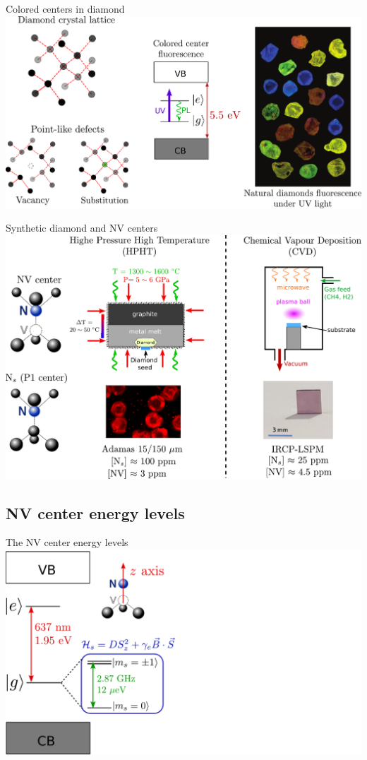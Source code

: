 \documentclass{beamer}
\begin{document}
\begin{frame}{Colored centers in diamond}
\centering
\includegraphics[width=\textwidth,height=0.85\textheight,keepaspectratio]{Slide diamant}
\end{frame}

\begin{frame}{Synthetic diamond and NV centers}
\centering
\includegraphics[width=\textwidth,height=0.85\textheight,keepaspectratio]{Slide_fab_sample}
\end{frame}

\subsection{NV center energy levels}
\begin{frame}{The NV center energy levels}
\centering
\includegraphics[width=\textwidth,height=0.85\textheight,keepaspectratio]{Slide_NV_levels_1}
\end{frame}
\end{document}
